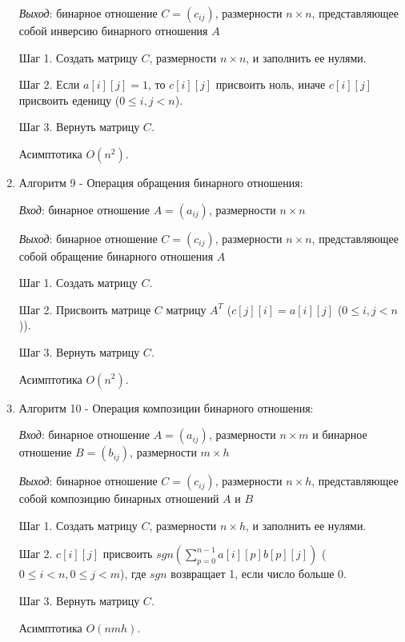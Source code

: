 \documentclass[spec, och, labwork]{shiza}
\begin{document}
\begin{enumerate}
                \textit{Выход}: бинарное отношение $C = (c_{ij})$, размерности $n \times n$, представляющее собой инверсию бинарного отношения $A$

                Шаг 1. Создать матрицу $C$, размерности $n \times n$, и заполнить ее нулями.

                Шаг 2. Если $a[i][j]  = 1$, то $c[i][j]$ присвоить ноль, иначе $c[i][j]$ присвоить еденицу ($0 \leq i, j < n$).

                Шаг 3. Вернуть матрицу $C$.

                Асимптотика $O(n^2)$.

                \item Алгоритм 9 - Операция обращения бинарного отношения:
                
                \textit{Вход}: бинарное отношение $A = (a_{ij})$, размерности $n \times n$

                \textit{Выход}: бинарное отношение $C = (c_{ij})$, размерности $n \times n$, представляющее собой обращение бинарного отношения $A$

                Шаг 1. Создать матрицу $C$.

                Шаг 2. Присвоить матрице $C$ матрицу $A^T$ ($c[j][i] = a[i][j]$ ($0 \leq i, j < n$)).

                Шаг 3. Вернуть матрицу $C$.

                Асимптотика $O(n^2)$.

                \item Алгоритм 10 - Операция композиции бинарного отношения:
                
                \textit{Вход}: бинарное отношение $A = (a_{ij})$, размерности $n \times m$ и бинарное отношение $B = (b_{ij})$, размерности $m \times h$

                \textit{Выход}: бинарное отношение $C = (c_{ij})$, размерности $n \times h$, представляющее собой композицию бинарных отношений $A$ и $B$

                Шаг 1. Создать матрицу $C$, размерности $n \times h$, и заполнить ее нулями.

                Шаг 2. $c[i][j]$ присвоить $sgn(\sum\limits_{p=0}^{n-1} a[i][p]b[p][j])$ ($0 \leq i < n, 0 \leq j < m$), где $sgn$ возвращает 1, если число больше 0.

                Шаг 3. Вернуть матрицу $C$.

                Асимптотика $O(nmh)$.
            \end{enumerate}
\end{document}
